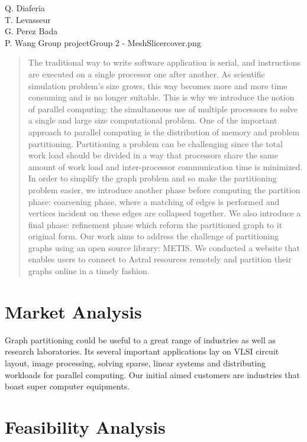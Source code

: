 \documentclass{cranfieldChart}
\begin{document}
{Q. Diaferia\\
T. Levasseur\\
G. Perez Bada\\
P. Wang
}{Group project}{Group 2 - MeshSlicer}{cover.png}

\newpage
\tableofcontents
\newpage

\begin{abstract}
The traditional way to write software application is serial, and instructions are executed on a single processor one after another.
As scientific simulation problem's size grows, this way becomes more and more time consuming and is no longer suitable. This is why we introduce the notion of parallel computing: the simultaneous use of multiple processors to solve a single and large size computational problem. One of the important approach to parallel computing is the distribution of memory and problem partitioning. Partitioning a problem can be challenging since the total work load should be divided in a way that processors share the same amount of work load and inter-processor communication time is minimized. In order to simplify the graph problem and so make the partitioning problem easier, we introduce another phase before computing the partition phase: coarsening phase, where a matching of edges is performed and vertices incident on these edges are collapsed together. We also introduce a final phase: refinement phase which reform the partitioned graph to it original form. Our work aims to address the challenge of partitioning graphs using an open source library: METIS. We conducted a website that enables users to connect to Astral resources remotely and partition their graphs online in a timely fashion. 
\end{abstract}
\newpage
\section{Market Analysis}
Graph partitioning could be useful to a great range of industries as well as research laboratories. Its several important applications lay on VLSI circuit layout, image processing, solving sparse, linear systems and distributing workloads for parallel computing. Our initial aimed customers are industries that boast super computer equipments.
\section{Feasibility Analysis} 
\end{document}
